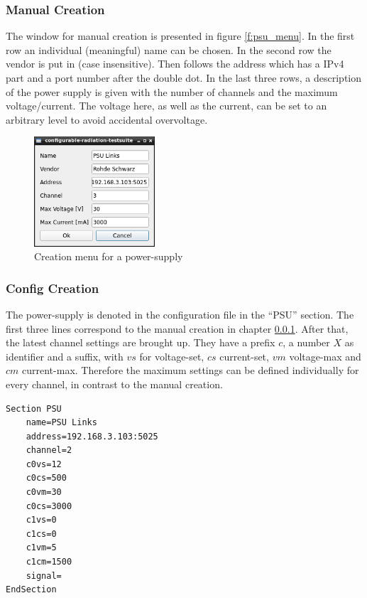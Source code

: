 \documentclass[10pt,a4paper]{article}
\begin{document}
	\subsubsection{Manual Creation}	
	\label{c:psu_manual_creation}
	
	The window for manual creation is presented in figure \eqref{f:psu_menu}. In the first row an individual (meaningful) name can be chosen. In the second row the vendor is put in (case insensitive). Then follows the address which has a IPv4 part and a port number after the double dot. In the last three rows, a description of the power supply is given with the number of channels and the maximum voltage/current. The voltage here, as well as the current, can be set to an arbitrary level to avoid accidental overvoltage.
	
	\begin{figure}[H]
	\centering
	\includegraphics[width=0.4\textwidth]{./2_PSU_menu.png}
	\caption{Creation menu for a power-supply}
	\label{f:psu_menu}
	\end{figure}
	
	\subsubsection{Config Creation}
	
	The power-supply is denoted in the configuration file in the \enquote{PSU} section. The first three lines correspond to the manual creation in chapter \ref{c:psu_manual_creation}. After that, the latest channel settings are brought up. They have a prefix $c$, a number $X$ as identifier and a suffix, with $vs$ for voltage-set, $cs$ current-set, $vm$ voltage-max and $cm$ current-max. Therefore the maximum settings can be defined individually for every channel, in contrast to the manual creation.
	
\begin{lstlisting}[caption=PSU Config]
Section PSU
	name=PSU Links
	address=192.168.3.103:5025
	channel=2
	c0vs=12
	c0cs=500
	c0vm=30
	c0cs=3000
	c1vs=0
	c1cs=0
	c1vm=5
	c1cm=1500
	signal=
EndSection
\end{lstlisting}
	
\end{document}
